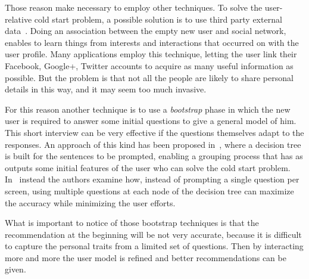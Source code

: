 Those reason make necessary to employ other techniques. To solve the user-relative cold start problem, a possible solution is to use third party external data~\cite{son2016dealing}. Doing an association between the empty new user and social network, enables to learn things from interests and interactions that occurred on with the user profile. Many applications employ this technique, letting the user link their Facebook, Google+, Twitter accounts to acquire as many useful information as possible. But the problem is that not all the people are likely to share personal details in this way, and it may seem too much invasive.

For this reason another technique is to use a \textit{bootstrap} phase in which the new user is required to answer some initial questions to give a general model of him. This short interview can be very effective if the questions themselves adapt to the responses. An approach of this kind has been proposed in~\cite{lika2014facing}, where a decision tree is built for the sentences to be prompted, enabling a grouping process that has as outputs some initial features of the user who can solve the cold start problem. In~\cite{sun2013learning} instead the authors examine how, instead of prompting a single question per screen, using multiple questions at each node of the decision tree can maximize the accuracy while minimizing the user efforts.

What is important to notice of those bootstrap techniques is that the recommendation at the beginning will be not very accurate, because it is difficult to capture the personal traits from a limited set of questions. Then by interacting more and more the user model is refined and better recommendations can be given.


